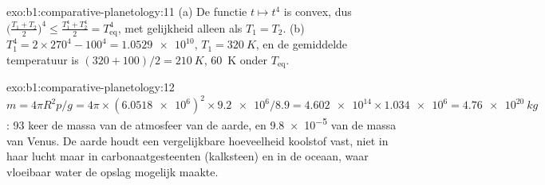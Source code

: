 \begin{solution}{exo:b1:comparative-planetology:11}
(a) De functie $t\mapsto t^4$ is convex, dus
$\bigl(\tfrac{T_1 + T_2}{2}\bigr)^4 \le \tfrac{T_1^4 + T_2^4}{2} =
T_\mathrm{eq}^4$, met gelijkheid alleen als $T_1 = T_2$. (b) $T_1^4 =
2\times270^4 - 100^4 = \num{1.0529e10}$, $T_1 = \qty{320}{K}$, en de gemiddelde
temperatuur is $(320 + 100)/2 = \qty{210}{K}$, \qty{60}{K} onder
$T_\mathrm{eq}$.
\end{solution}

\begin{solution}{exo:b1:comparative-planetology:12}
$m = 4\pi R^2p/g = 4\pi\times(\num{6.0518e6})^2\times\num{9.2e6}/8.9 =
\num{4.602e14}\times\num{1.034e6} = \qty{4.76e20}{kg}$: 93 keer de massa van de
atmosfeer van de aarde, en \num{9.8e-5} van de massa van Venus. De aarde houdt een vergelijkbare
hoeveelheid koolstof vast, niet in haar lucht maar in carbonaatgesteenten (kalksteen) en in de
oceaan, waar vloeibaar water de opslag mogelijk maakte.
\end{solution}

